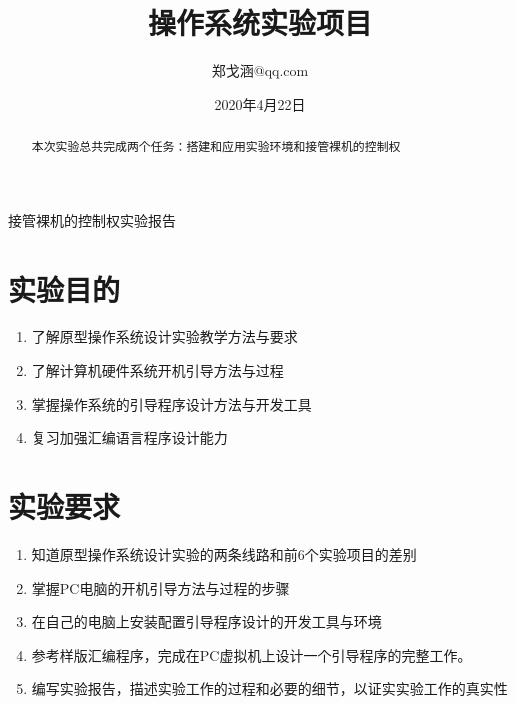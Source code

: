 \documentclass[a4paper, 11pt]{article} %
\title{\textbf{操作系统实验项目}\\ %
} %
\author{郑戈涵\quad 17338233\quad 931252924@qq.com} %
\date{2020年4月22日} %
\makeatletter
\renewcommand{\maketitle}{ %
\begin{center} %
{\LARGE\@title} %

\large{\@subtitle}

\vspace{1em} %

{\large\@author} %

\end{center}
}
\newcommand\@subtitle{接管裸机的控制权实验报告}
\makeatother
\begin{document}
\maketitle %


\renewcommand{\abstractname}{摘要} %

\begin{abstract}
  本次实验总共完成两个任务：搭建和应用实验环境和接管裸机的控制权
\end{abstract}


\vspace{1em} %

\setcounter{tocdepth}{2}
\renewcommand{\contentsname}{目录}
\tableofcontents


\pagebreak

\section{实验目的}

\begin{enumerate}
  \item 了解原型操作系统设计实验教学方法与要求 
  \item 了解计算机硬件系统开机引导方法与过程 
  \item 掌握操作系统的引导程序设计方法与开发工具 
  \item 复习加强汇编语言程序设计能力 
\end{enumerate}


\section{实验要求}

\begin{enumerate}
  \item 知道原型操作系统设计实验的两条线路和前6个实验项目的差别 
  \item 掌握PC电脑的开机引导方法与过程的步骤 
  \item 在自己的电脑上安装配置引导程序设计的开发工具与环境 
  \item 参考样版汇编程序，完成在PC虚拟机上设计一个引导程序的完整工作。 
  \item 编写实验报告，描述实验工作的过程和必要的细节，以证实实验工作的真实性 
\end{enumerate}
\end{document}
